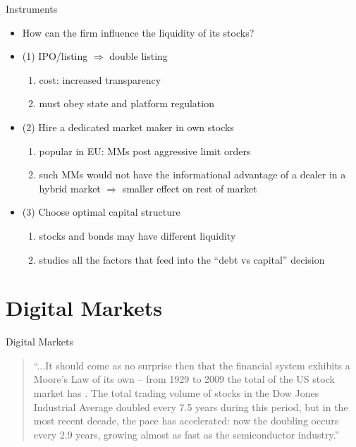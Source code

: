 \documentclass[english,10pt
,aspectratio=169
]{beamer}
\begin{document}
\begin{frame}{Instruments}
	\begin{itemize}
		\item How can the firm influence the liquidity of its stocks?
		\item (1) IPO/listing $\Rightarrow$ double listing
		\begin{enumerate}
			\item cost: increased transparency
			\item must obey state and platform regulation
		\end{enumerate}
		\item (2) Hire a dedicated market maker in own stocks
		\begin{enumerate}
			\item popular in EU: MMs post aggressive limit orders
			\item such MMs would not have the informational advantage of a dealer in a hybrid market $\Rightarrow$ smaller effect on rest of market
		\end{enumerate}
		\item (3) Choose optimal capital structure
		\begin{enumerate}
			\item stocks and bonds may have different liquidity
			\item {} studies all the factors that feed into the ``debt vs capital'' decision
		\end{enumerate}
	\end{itemize}
\end{frame}



\section{Digital Markets}

\begin{frame}{Digital Markets}
	\begin{quotation}
		``...It should come as no surprise then that the financial system exhibits a Moore's Law of its own -- from 1929 to 2009 the total  of the US stock market has . The total \alert{trading volume} of stocks in the Dow Jones Industrial Average \alert{doubled every 7.5 years} during this period, but in the most recent decade, the \alert{pace has accelerated}: now the doubling occurs every 2.9 years, growing almost as fast as the semiconductor industry.''
		\begin{flushright}
			\cite{kirilenko_moores_2013}
		\end{flushright}
	\end{quotation}
\end{frame}
\end{document}
